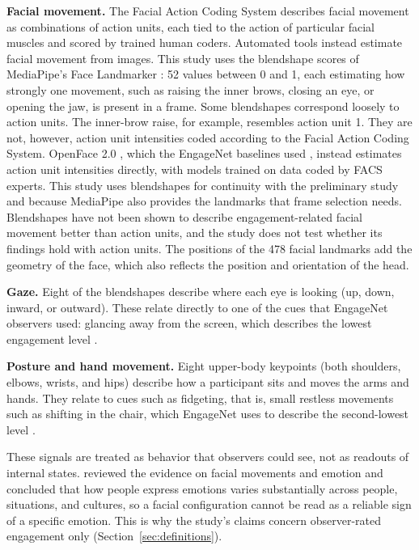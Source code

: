 \textbf{Facial movement.} The Facial Action Coding System \cite{ekman1978} describes facial movement as combinations of action units, each tied to the action of particular facial muscles and scored by trained human coders. Automated tools instead estimate facial movement from images. This study uses the blendshape scores of MediaPipe's Face Landmarker \cite{lugaresi2019}: 52 values between 0 and 1, each estimating how strongly one movement, such as raising the inner brows, closing an eye, or opening the jaw, is present in a frame. Some blendshapes correspond loosely to action units. The inner-brow raise, for example, resembles action unit 1. They are not, however, action unit intensities coded according to the Facial Action Coding System. OpenFace 2.0 \cite{baltrusaitis2018}, which the EngageNet baselines used \cite{singh2023}, instead estimates action unit intensities directly, with models trained on data coded by FACS experts. This study uses blendshapes for continuity with the preliminary study and because MediaPipe also provides the landmarks that frame selection needs. Blendshapes have not been shown to describe engagement-related facial movement better than action units, and the study does not test whether its findings hold with action units. The positions of the 478 facial landmarks add the geometry of the face, which also reflects the position and orientation of the head.

\textbf{Gaze.} Eight of the blendshapes describe where each eye is looking (up, down, inward, or outward). These relate directly to one of the cues that EngageNet observers used: glancing away from the screen, which describes the lowest engagement level \cite{singh2023}.

\textbf{Posture and hand movement.} Eight upper-body keypoints (both shoulders, elbows, wrists, and hips) describe how a participant sits and moves the arms and hands. They relate to cues such as fidgeting, that is, small restless movements such as shifting in the chair, which EngageNet uses to describe the second-lowest level \cite{singh2023}.

These signals are treated as behavior that observers could see, not as readouts of internal states.  reviewed the evidence on facial movements and emotion and concluded that how people express emotions varies substantially across people, situations, and cultures, so a facial configuration cannot be read as a reliable sign of a specific emotion. This is why the study's claims concern observer-rated engagement only (Section~\ref{sec:definitions}).


